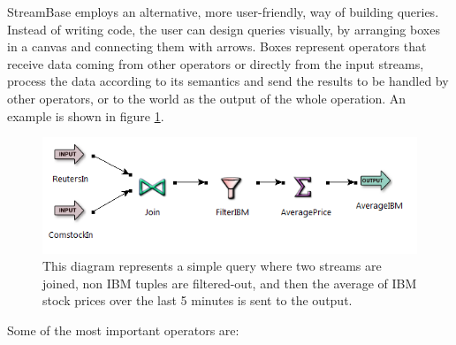 \documentclass{report}
\begin{document}
StreamBase employs an alternative, more user-friendly, way of building
queries. Instead of writing code, the user can design queries
visually, by arranging boxes in a canvas and connecting them with
arrows. Boxes represent operators that receive data coming from other
operators or directly from the input streams, process the data
according to its semantics and send the results to be handled by other
operators, or to the world as the output of the whole operation. An
example is shown in figure \ref{fig:eventflow-sample}.

\begin{figure}[htbp]
  \centering
  \includegraphics[width=\textwidth]{eventflow.png}
  \caption{This diagram represents a simple query where two streams
    are joined, non IBM tuples are filtered-out, and then the average
    of IBM stock prices over the last 5 minutes is sent to the
    output.}
  \label{fig:eventflow-sample}
\end{figure}

Some of the most important operators are:
\end{document}
